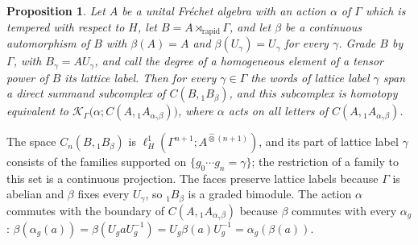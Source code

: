 \documentclass[11pt]{amsart}
\newtheorem{proposition}[theorem]{Proposition}
\theoremstyle{definition}
\theoremstyle{remark}
\begin{document}
\begin{proposition}\label{prop:crossed}
Let $A$ be a unital Fr\'echet algebra with an action $\alpha$ of
$\Gamma$ which is tempered with respect to $H$, let
$B=A\rtimes_{\mathrm{rapid}}\Gamma$, and let $\beta$ be a continuous
automorphism of $B$ with $\beta(A)=A$ and $\beta(U_{\gamma})=U_{\gamma}$ for
every $\gamma$.  Grade $B$ by $\Gamma$, with $B_{\gamma}=AU_{\gamma}$, and call
the degree of a homogeneous element of a tensor power of $B$ its
\emph{lattice label}.  Then for every $\gamma\in\Gamma$ the words of lattice
label $\gamma$ span a direct summand subcomplex of $C(B,{}_{1}B_{\beta})$, and
this subcomplex is homotopy equivalent to
$\mathcal K_{\Gamma}\bigl(\alpha;C(A,{}_{1}A_{\alpha_{\gamma}\beta})\bigr)$,
where $\alpha$ acts on all letters of $C(A,{}_{1}A_{\alpha_{\gamma}\beta})$.
\end{proposition}

The space $C_n(B,{}_{1}B_{\beta})$ is $\ell^{1}_{H}(\Gamma^{n+1};A^{\widehat\otimes
(n+1)})$, and its part of lattice label $\gamma$ consists of the families
supported on $\{g_0\cdots g_n=\gamma\}$; the restriction of a family to this
set is a continuous projection.  The faces preserve lattice labels because
$\Gamma$ is abelian and $\beta$ fixes every $U_{\gamma}$, so ${}_{1}B_{\beta}$
is a graded bimodule.  The action $\alpha$ commutes with the boundary of
$C(A,{}_{1}A_{\alpha_{\gamma}\beta})$ because $\beta$ commutes with every
$\alpha_g$:
$\beta(\alpha_g(a))=\beta(U_gaU_g^{-1})=U_g\beta(a)U_g^{-1}=\alpha_g(\beta(a))$.
\end{document}

